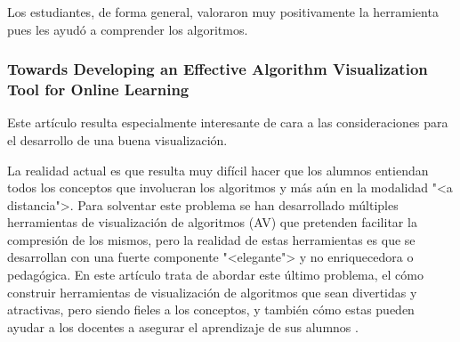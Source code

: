 Los estudiantes, de forma general, valoraron muy positivamente la herramienta
pues les ayudó a comprender los algoritmos.

\subsubsection{Towards Developing an Effective Algorithm Visualization Tool for
Online Learning} 

Este artículo resulta especialmente interesante de cara a las consideraciones
para el desarrollo de una buena visualización.


La realidad actual es que resulta muy difícil hacer que los alumnos entiendan
todos los conceptos que involucran los algoritmos y más aún en la modalidad "<a
distancia">. Para solventar este problema se han desarrollado múltiples
herramientas de visualización de algoritmos (AV) que pretenden facilitar la
compresión de los mismos, pero la realidad de estas herramientas es que se
desarrollan con una fuerte componente "<elegante"> y no enriquecedora o
pedagógica. En este artículo trata de abordar este último problema, el cómo
construir herramientas de visualización de algoritmos que sean divertidas y
atractivas, pero siendo fieles a los conceptos, y también cómo estas pueden
ayudar a los docentes a asegurar el aprendizaje de sus alumnos \cite{8560314}.

